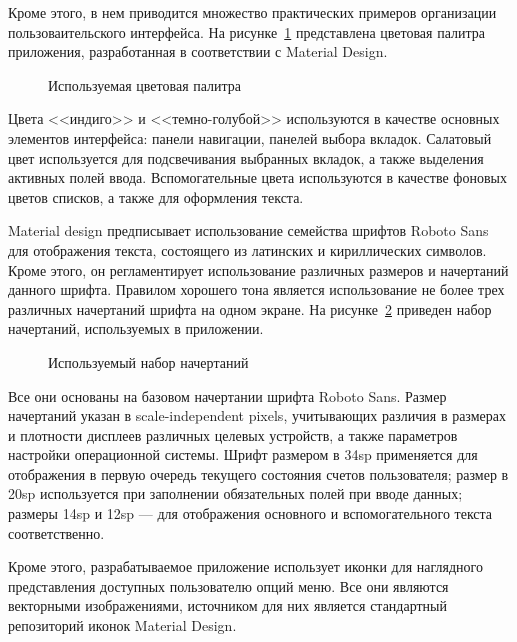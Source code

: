 Кроме этого, в нем приводится множество практических примеров
организации пользоваительского интерфейса.
На рисунке~\ref{fig:design_colors} представлена цветовая палитра
приложения, разработанная в соответствии с Material Design.

\begin{figure}[h!]
  \centering
  \caption{Используемая цветовая палитра}
  \label{fig:design_colors}
\end{figure}

Цвета <<индиго>> и <<темно-голубой>>
используются в качестве основных элементов интерфейса:
панели навигации, панелей выбора вкладок.
Салатовый цвет используется для подсвечивания выбранных вкладок,
а также выделения активных полей ввода.
Вспомогательные цвета используются в качестве фоновых цветов списков,
а также для оформления текста.

Material design предписывает использование семейства шрифтов
Roboto Sans для отображения текста, состоящего из латинских
и кириллических символов. Кроме этого, он регламентирует
использование различных размеров и начертаний данного шрифта.
Правилом хорошего тона является использование не более трех
различных начертаний шрифта на одном экране.
На рисунке~\ref{fig:design_fonts} приведен набор начертаний,
используемых в приложении.

\begin{figure}[h!]
  \centering
  \caption{Используемый набор начертаний}
  \label{fig:design_fonts}
\end{figure}

Все они основаны на базовом начертании шрифта Roboto Sans.
Размер начертаний указан в scale-independent pixels, учитывающих различия
в размерах и плотности дисплеев различных целевых устройств,
а также параметров настройки операционной системы.
Шрифт размером в 34sp применяется для отображения в первую очередь
текущего состояния счетов пользователя;
размер в 20sp используется при заполнении обязательных полей при вводе данных;
размеры 14sp и 12sp --- для отображения основного и вспомогательного текста
соответственно.

Кроме этого, разрабатываемое приложение использует иконки для
наглядного представления доступных пользователю опций меню.
Все они являются векторными изображениями, источником для них
является стандартный репозиторий иконок Material Design.